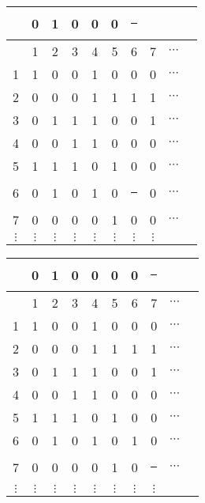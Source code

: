\documentclass[compress,17pt]{beamer}
\newcommand\hl{\bgroup\markoverwith
    {\textcolor{yellow}{\rule[-.5ex]{.1pt}{2.5ex}}}\ULon}
\begin{document}
\begin{frame}
  \begin{tabular}{ | c | c c c c c c c c c }
    \hline
    &  0 & 1 & 0 & 0 & 0 & \hl 0\\
    \hline
      & 1 & 2 & 3 & 4 & 5 & 6 & 7 & $\cdots$\\
      \hline
    1 & 1 & 0 & 0 & 1 & 0 & 0 & 0 & $\cdots$\\
    2 & 0 & 0 & 0 & 1 & 1 & 1 & 1 & $\cdots$\\
    3 & 0 & 1 & 1 & 1 & 0 & 0 & 1 & $\cdots$\\
    4 & 0 & 0 & 1 & 1 & 0 & 0 & 0 & $\cdots$\\
    5 & 1 & 1 & 1 & 0 & 1 & 0 & 0 & $\cdots$\\
    6 & 0 & 1 & 0 & 1 & 0 & \hl 1 & 0 & $\cdots$\\
    7 & 0 & 0 & 0 & 0 & 1 & 0 & 0 & $\cdots$\\
    $\vdots$ & $\vdots$ & $\vdots$ & $\vdots$ & $\vdots$ & $\vdots$ & $\vdots$ & $\vdots$ & \\
  \end{tabular}
\end{frame}

\begin{frame}
  \begin{tabular}{ | c | c c c c c c c c c }
    \hline
    & 0 & 1 & 0 & 0 & 0 & 0 & \hl 1 \\
    \hline
      & 1 & 2 & 3 & 4 & 5 & 6 & 7 & $\cdots$\\
      \hline
    1 & 1 & 0 & 0 & 1 & 0 & 0 & 0 & $\cdots$\\
    2 & 0 & 0 & 0 & 1 & 1 & 1 & 1 & $\cdots$\\
    3 & 0 & 1 & 1 & 1 & 0 & 0 & 1 & $\cdots$\\
    4 & 0 & 0 & 1 & 1 & 0 & 0 & 0 & $\cdots$\\
    5 & 1 & 1 & 1 & 0 & 1 & 0 & 0 & $\cdots$\\
    6 & 0 & 1 & 0 & 1 & 0 & 1 & 0 & $\cdots$\\
    7 & 0 & 0 & 0 & 0 & 1 & 0 & \hl 0 & $\cdots$\\
    $\vdots$ & $\vdots$ & $\vdots$ & $\vdots$ & $\vdots$ & $\vdots$ & $\vdots$ & $\vdots$ & \\
  \end{tabular}
\end{frame}
\end{document}
